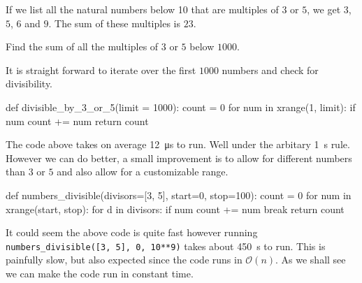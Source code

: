 
\begin{ProjectEuler}{1}

If we list all the natural numbers below 10 that are multiples of $3$ or $5$, we get $3$, $5$, $6$ and $9$. The sum of these multiples is $23$.
\medskip

\noindent Find the sum of all the multiples of $3$ or $5$ below $1000$.

\end{ProjectEuler}

It is straight forward to iterate over the first $1000$ numbers and check for divisibility.

\begin{pythoncode}
	def divisible_by_3_or_5(limit = 1000):
	    count = 0
	    for num in xrange(1, limit):
	        if num%
	            count += num
	    return count
\end{pythoncode}
%
The code above takes on average \SI{12}{\micro\s} to run. Well under the arbitary \SI{1}{\s} rule. However we can do better, a small improvement
is to allow for different numbers than $3$ or $5$ and also allow for a customizable range. 
%
\begin{pythoncode}
	def numbers_divisible(divisors=[3, 5], start=0, stop=100):
	    count = 0
	    for num in xrange(start, stop):
	        for d in divisors:
	            if num %
	                count += num
	                break
	    return count
\end{pythoncode}
%
It could seem the above code is quite fast however running \verb|numbers_divisible([3, 5], 0, 10**9)| takes about \SI{450}{\s} to run. 
This is painfully slow, but also expected since the code runs in $\mathcal{O}(n)$. As we shall see we can make the code run in constant time. 
%
